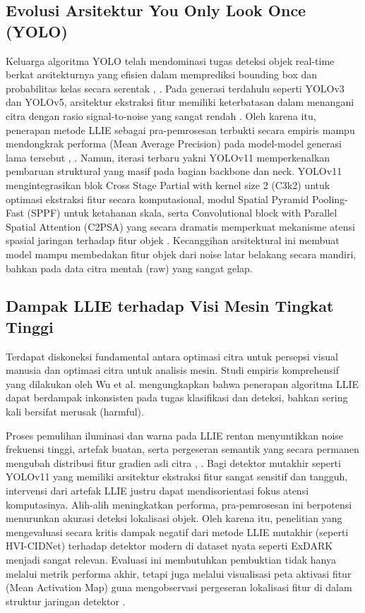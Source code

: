 \documentclass[conference]{IEEEtran}
\begin{document}
\subsection{Evolusi Arsitektur You Only Look Once (YOLO)} Keluarga algoritma YOLO telah mendominasi tugas deteksi objek real-time berkat arsitekturnya yang efisien dalam memprediksi bounding box dan probabilitas kelas secara serentak \cite{terven2023yoloreview}, \cite{sapkota2025yoloreview}. Pada generasi terdahulu seperti YOLOv3 dan YOLOv5, arsitektur ekstraksi fitur memiliki keterbatasan dalam menangani citra dengan rasio signal-to-noise yang sangat rendah \cite{wang2023yolov5lowlight}. Oleh karena itu, penerapan metode LLIE sebagai pra-pemrosesan terbukti secara empiris mampu mendongkrak performa (Mean Average Precision) pada model-model generasi lama tersebut \cite{shovo2024lowlight}, \cite{peng2024yolov5llie}.
Namun, iterasi terbaru yakni YOLOv11 memperkenalkan pembaruan struktural yang masif pada bagian backbone dan neck. YOLOv11 mengintegrasikan blok Cross Stage Partial with kernel size 2 (C3k2) untuk optimasi ekstraksi fitur secara komputasional, modul Spatial Pyramid Pooling-Fast (SPPF) untuk ketahanan skala, serta Convolutional block with Parallel Spatial Attention (C2PSA) yang secara dramatis memperkuat mekanisme atensi spasial jaringan terhadap fitur objek \cite{khanam2024yolov11}. Kecanggihan arsitektural ini membuat model mampu membedakan fitur objek dari noise latar belakang secara mandiri, bahkan pada data citra mentah (raw) yang sangat gelap.

\subsection{Dampak LLIE terhadap Visi Mesin Tingkat Tinggi} Terdapat diskoneksi fundamental antara optimasi citra untuk persepsi visual manusia dan optimasi citra untuk analisis mesin. Studi empiris komprehensif yang dilakukan oleh Wu et al. \cite{wu2024llieeffect} mengungkapkan bahwa penerapan algoritma LLIE dapat berdampak inkonsisten pada tugas klasifikasi dan deteksi, bahkan sering kali bersifat merusak (harmful).

Proses pemulihan iluminasi dan warna pada LLIE rentan menyuntikkan noise frekuensi tinggi, artefak buatan, serta pergeseran semantik yang secara permanen mengubah distribusi fitur gradien asli citra \cite{wang2023yolov5lowlight}, \cite{gong2025multiscale}. Bagi detektor mutakhir seperti YOLOv11 yang memiliki arsitektur ekstraksi fitur sangat sensitif dan tangguh, intervensi dari artefak LLIE justru dapat mendisorientasi fokus atensi komputasinya. Alih-alih meningkatkan performa, pra-pemrosesan ini berpotensi menurunkan akurasi deteksi lokalisasi objek. Oleh karena itu, penelitian yang mengevaluasi secara kritis dampak negatif dari metode LLIE mutakhir (seperti HVI-CIDNet) terhadap detektor modern di dataset nyata seperti ExDARK \cite{loh2019exdark} menjadi sangat relevan. Evaluasi ini membutuhkan pembuktian tidak hanya melalui metrik performa akhir, tetapi juga melalui visualisasi peta aktivasi fitur (Mean Activation Map) guna mengobservasi pergeseran lokalisasi fitur di dalam struktur jaringan detektor \cite{metrics2026formulas}.
\end{document}
